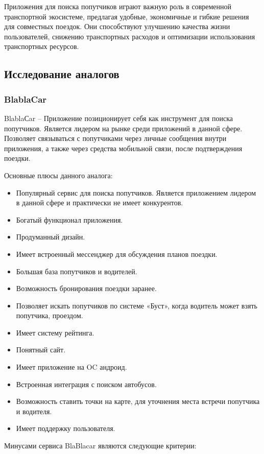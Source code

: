 Приложения для поиска попутчиков играют важную роль в современной транспортной экосистеме, предлагая удобные, экономичные и гибкие решения для совместных поездок. Они способствуют улучшению качества жизни пользователей, снижению транспортных расходов и оптимизации использования транспортных ресурсов.

\subsection{Исследование аналогов}
\subsubsection{BlablaCar}
BlablaСar – Приложение позиционирует себя как инструмент для поиска попутчиков. Является лидером на рынке среди приложений в данной сфере. Позволяет связываться с попутчиками через личные сообщения внутри приложения, а также через средства мобильной связи, после подтверждения поездки.

Основные плюсы данного аналога:

\begin{itemize}
\item Популярный сервис для поиска попутчиков. Является приложением лидером в данной сфере и практически не имеет конкурентов.
\item Богатый функционал приложения.
\item Продуманный дизайн.
\item Имеет встроенный мессенджер для обсуждения планов поездки.
\item Большая база попутчиков и водителей.
\item Возможность бронирования поездки заранее.
\item Позволяет искать попутчиков по системе «Буст», когда водитель может взять попутчика, проездом.
\item Имеет систему рейтинга.
\item Понятный сайт.
\item Имеет приложение на OC андроид.
\item Встроенная интеграция с поиском автобусов.
\item Возможность ставить точки на карте, для уточнения места встречи попутчика и водителя.
\item Имеет поддержку пользователя.
\end{itemize}


Минусами сервиса BlaBlacar являются следующие критерии:

